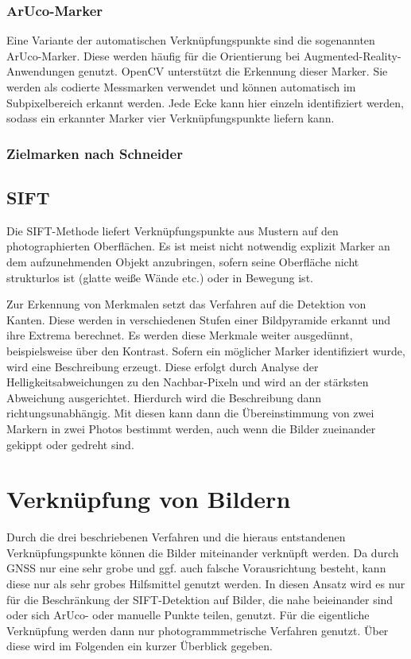 \documentclass[./00PhotoBox.tex]{subfiles}
\begin{document}
\subsubsection{ArUco-Marker}
Eine Variante der automatischen Verknüpfungspunkte sind die sogenannten ArUco-Marker. Diese werden häufig für die Orientierung bei Augmented-Reality-Anwend\-ungen genutzt. OpenCV unterstützt die Erkennung dieser Marker. Sie werden als codierte Messmarken verwendet und können automatisch im Subpixelbereich erkannt werden. Jede Ecke kann hier einzeln identifiziert werden, sodass ein erkannter Marker vier Verknüpfungspunkte liefern kann.

\subsubsection{Zielmarken nach Schneider}
\citep[S. 541]{luhmann}

\subsection{SIFT}
Die SIFT-Methode liefert Verknüpfungspunkte aus Mustern auf den photographierten Oberflächen. Es ist meist nicht notwendig explizit Marker an dem aufzunehmenden Objekt anzubringen, sofern seine Oberfläche nicht strukturlos ist (glatte weiße Wände etc.) oder in Bewegung ist.

Zur Erkennung von Merkmalen setzt das Verfahren auf die Detektion von Kanten. Diese werden in verschiedenen Stufen einer Bildpyramide erkannt und ihre Extrema berechnet. Es werden diese Merkmale weiter ausgedünnt, beispielsweise über den Kontrast. Sofern ein möglicher Marker identifiziert wurde, wird eine Beschreibung erzeugt. Diese erfolgt  durch Analyse der Helligkeitsabweichungen zu den Nachbar-Pixeln und wird an der stärksten Abweichung ausgerichtet. Hierdurch wird die Beschreibung dann richtungsunabhängig. Mit diesen kann dann die Übereinstimmung von zwei Markern in zwei Photos bestimmt werden, auch wenn die Bilder zueinander gekippt oder gedreht sind.
\citep[S. 483]{luhmann4}

\section{Verknüpfung von Bildern}
\label{s:photogramm}
Durch die drei beschriebenen Verfahren und die hieraus entstandenen Verknüpfungs\-punkte können die Bilder miteinander verknüpft werden. Da durch GNSS nur eine sehr grobe und ggf. auch falsche Vorausrichtung besteht, kann diese nur als sehr grobes Hilfsmittel genutzt werden. In diesen Ansatz wird es nur für die Beschränkung der SIFT-Detektion auf Bilder, die nahe beieinander sind oder sich ArUco- oder manuelle Punkte teilen, genutzt.
Für die eigentliche Verknüpfung werden dann nur photogrammmetrische Verfahren genutzt. Über diese wird im Folgenden ein kurzer Überblick gegeben.
\end{document}
